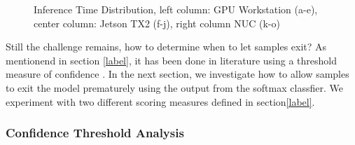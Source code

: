 \begin{figure}
\begin{minipage}{.33\textwidth}
		\hfill
		\hfill
	\end{minipage}
	\caption[Platform Inference Time of \gls{dnn}s]{Inference Time Distribution, left column: GPU Workstation (a-e), center column: Jetson TX2 (f-j), right column NUC (k-o)}
	\label{fig:inference-time-dist}
\end{figure}

Still the challenge remains, how to determine when to let samples exit? As mentionend in section \ref{label}, it has been done in literature using a threshold measure of confidence \cite{leroux_cascading_2017, teerapittayanon_branchynet:_2016}. In the next section, we investigate how to allow samples to exit the model prematurely using the output from the softmax classfier. We experiment with two different scoring measures defined in section\ref{label}.


\subsubsection{Confidence Threshold Analysis}


